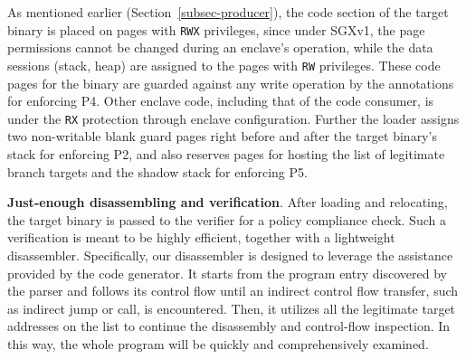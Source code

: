 As mentioned earlier (Section~\ref{subsec-producer}), the code section of the target binary is placed on pages with \texttt{RWX} privileges, since under SGXv1, the page permissions cannot be changed during an enclave's operation, while the data sessions (stack, heap) are assigned to the pages with \texttt{RW} privileges. These code pages for the binary are guarded against any write operation by the annotations for enforcing P4. Other enclave code, including that of the code consumer, is under the \texttt{RX} protection through enclave configuration. Further the loader assigns two non-writable blank guard pages right before and after the target binary's stack for enforcing P2, and also reserves pages for hosting the list of legitimate branch targets and the shadow stack for enforcing P5. 






\vspace{3pt}\noindent\textbf{Just-enough disassembling and verification}.
\label{subsec-disassembling} After loading and relocating, the target binary is passed to the verifier for a policy compliance check. Such a verification is meant to be highly efficient, together with a lightweight disassembler. Specifically, our disassembler is designed to leverage the assistance provided by the code generator.  It starts from the program entry discovered by the parser and follows its control flow until an indirect control flow transfer, such as indirect jump or call, is encountered. Then, it utilizes all the legitimate target addresses on the list to continue the disassembly and control-flow inspection. In this way, the whole program will be quickly and comprehensively examined.  

